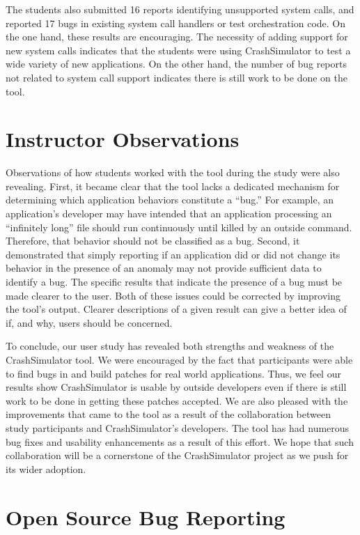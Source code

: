The students also submitted 16 reports identifying unsupported system calls, and reported 17 bugs in
existing system call handlers or test orchestration code.
On the one hand, these results are encouraging.  The necessity of adding
support for new system calls
indicates that the students were
using CrashSimulator to test a wide variety of new applications.
On the other hand, the number of bug reports not related to system call support
indicates there is still work to be done on the tool.


\section{Instructor Observations}
\label{subsec:tool-shortcomings}
Observations of how students worked  with the tool during the study were also revealing.
First,
it became clear that the tool
lacks a dedicated mechanism
for determining
which application behaviors constitute a ``bug.''
For example, an application's developer
may have intended that an application processing an ``infinitely long'' file should run continuously
until killed by an outside command.
Therefore, that behavior should not be classified as a bug.
Second,
it demonstrated that
simply reporting if an application did or did not change its behavior
in the presence of an anomaly may not provide sufficient data to identify a bug. The specific results that indicate the presence of a bug must be made clearer to the user.
Both of these issues could be corrected 
by improving the tool's output.
Clearer descriptions of a given result
can give a better idea of
if,
and why,
users should be concerned.

To conclude, our user study has revealed both strengths and weakness
of the CrashSimulator tool.
We were encouraged by the fact that participants were able to find bugs in and build patches for real world applications.
Thus, we feel our results show CrashSimulator is usable by outside developers even if there is still work to be done in getting these patches accepted. 
We are also pleased with the improvements that came to the tool as a result of the collaboration between study participants and CrashSimulator's developers.
The tool has had numerous bug fixes and usability enhancements as a result of this effort.
We hope that such collaboration will be a cornerstone of the CrashSimulator project as we push for its wider adoption.

\section{Open Source Bug Reporting}

